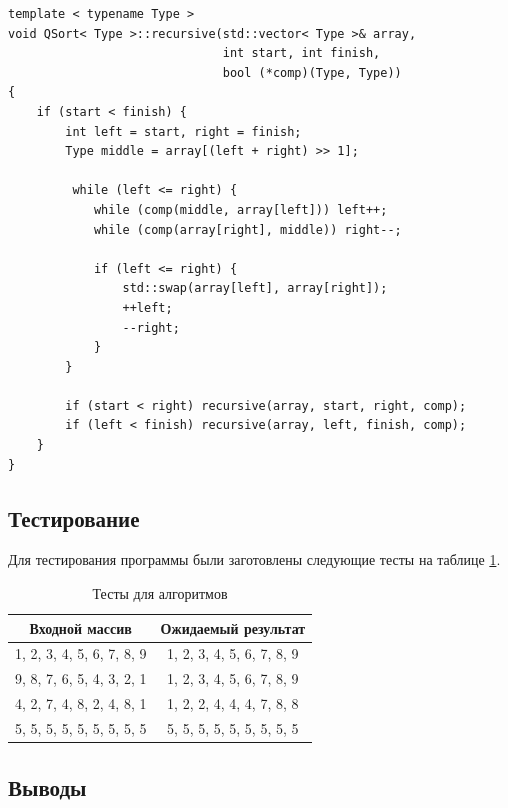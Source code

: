 \documentclass[a4paper,12pt]{article}
\begin{document}
\begin{lstlisting}[caption=Быстрая сортировка,label=list:qsort]
template < typename Type >
void QSort< Type >::recursive(std::vector< Type >& array,
                              int start, int finish,
                              bool (*comp)(Type, Type))
{
    if (start < finish) {
        int left = start, right = finish;
        Type middle = array[(left + right) >> 1];

         while (left <= right) {
            while (comp(middle, array[left])) left++;
            while (comp(array[right], middle)) right--;

            if (left <= right) {
                std::swap(array[left], array[right]);
                ++left;
                --right;
            }
        }

        if (start < right) recursive(array, start, right, comp);
        if (left < finish) recursive(array, left, finish, comp);
    }
}
\end{lstlisting}

\subsection{Тестирование}

Для тестирования программы были заготовлены следующие тесты на таблице \ref{table:test}.

\begin{table}[H]
    \centering
    \caption{Тесты для алгоритмов}
    \label{table:test}
    \begin{tabular}{|c|c|}
        \hline
        Входной массив & Ожидаемый результат \\
        \hline
        1, 2, 3, 4, 5, 6, 7, 8, 9 & 1, 2, 3, 4, 5, 6, 7, 8, 9 \\
        \hline
        9, 8, 7, 6, 5, 4, 3, 2, 1 & 1, 2, 3, 4, 5, 6, 7, 8, 9 \\
        \hline
        4, 2, 7, 4, 8, 2, 4, 8, 1 & 1, 2, 2, 4, 4, 4, 7, 8, 8 \\
        \hline
        5, 5, 5, 5, 5, 5, 5, 5, 5 & 5, 5, 5, 5, 5, 5, 5, 5, 5 \\
        \hline
    \end{tabular}
\end{table}

\subsection{Выводы}
\end{document}

